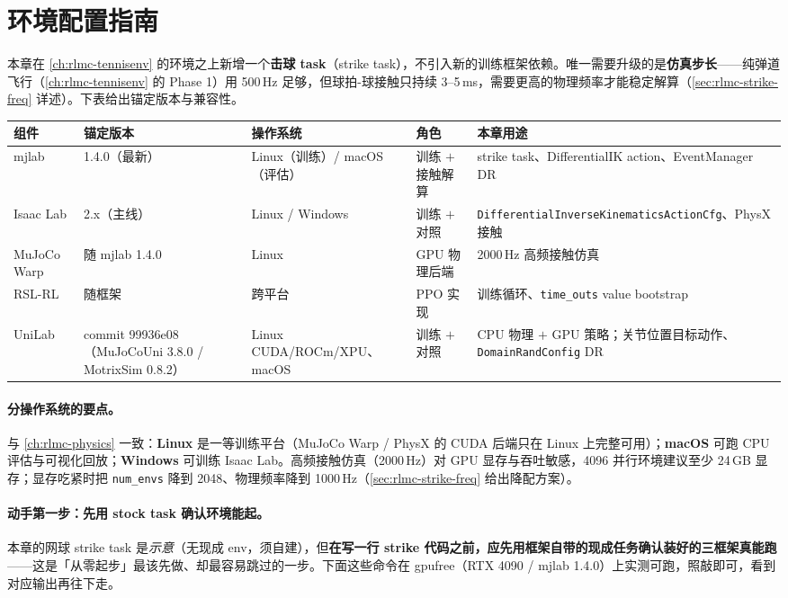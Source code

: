 \section*{环境配置指南}
\label{sec:rlmc-strike-env}

本章在 \cref{ch:rlmc-tennisenv} 的环境之上新增一个\textbf{击球 task}（strike task），不引入新的训练框架依赖。唯一需要升级的是\textbf{仿真步长}——纯弹道飞行（\cref{ch:rlmc-tennisenv} 的 Phase 1）用 500\,Hz 足够，但球拍-球接触只持续 3--5\,ms，需要更高的物理频率才能稳定解算（\cref{sec:rlmc-strike-freq} 详述）。下表给出锚定版本与兼容性。

\begin{center}
\small
\begin{tabular}{@{}lllll@{}}
\toprule
组件 & 锚定版本 & 操作系统 & 角色 & 本章用途 \\
\midrule
mjlab & 1.4.0（最新） & Linux（训练）/ macOS（评估） & 训练 $+$ 接触解算 & strike task、DifferentialIK action、EventManager DR \\
Isaac Lab & 2.x（主线） & Linux / Windows & 训练 $+$ 对照 & \verb|DifferentialInverseKinematicsActionCfg|、PhysX 接触 \\
MuJoCo Warp & 随 mjlab 1.4.0 & Linux & GPU 物理后端 & 2000\,Hz 高频接触仿真 \\
RSL-RL & 随框架 & 跨平台 & PPO 实现 & 训练循环、\verb|time_outs| value bootstrap \\
UniLab & commit 99936e08（MuJoCoUni 3.8.0 / MotrixSim 0.8.2） & Linux CUDA/ROCm/XPU、macOS & 训练 $+$ 对照 & CPU 物理 $+$ GPU 策略；关节位置目标动作、\verb|DomainRandConfig| DR \\
\bottomrule
\end{tabular}
\end{center}

\paragraph{分操作系统的要点。}与 \cref{ch:rlmc-physics} 一致：\textbf{Linux} 是一等训练平台（MuJoCo Warp / PhysX 的 CUDA 后端只在 Linux 上完整可用）；\textbf{macOS} 可跑 CPU 评估与可视化回放；\textbf{Windows} 可训练 Isaac Lab。高频接触仿真（2000\,Hz）对 GPU 显存与吞吐敏感，4096 并行环境建议至少 24\,GB 显存；显存吃紧时把 \verb|num_envs| 降到 2048、物理频率降到 1000\,Hz（\cref{sec:rlmc-strike-freq} 给出降配方案）。

\paragraph{动手第一步：先用 stock task 确认环境能起。}本章的网球 strike task 是\emph{示意}（无现成 env，须自建），但\textbf{在写一行 strike 代码之前，应先用框架自带的现成任务确认装好的三框架真能跑}——这是「从零起步」最该先做、却最容易跳过的一步。下面这些命令在 gpufree（RTX 4090 / mjlab 1.4.0）上实测可跑，照敲即可，看到对应输出再往下走。

